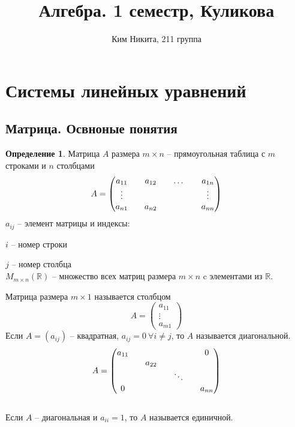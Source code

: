 \documentclass[a4paper, 12pt]{article}
\title{\textbf{Алгебра. 1 семестр, Куликова}}
\author{Ким Никита, 211 группа}
\theoremstyle{definition}
\newtheorem*{definition}{Определение}
\begin{document}
\fontsize{14pt}{20pt}\selectfont
    \maketitle
    \newpage
    \tableofcontents
    \fontsize{14pt}{20pt}\selectfont
    \newpage
    
    \section{Системы линейных уравнений}
    \subsection{Матрица. Освноные понятия}
    \begin{definition}
        Матрица $A$ размера $m\times n$ --   прямоугольная таблица с $m$ строками и $n$ столбцами 
        $$A = \begin{pmatrix}
            a_{11} && a_{12} && \dots && a_{1n}\\
            \vdots && \null && \null && \vdots\\
            a_{n1} && a_{n2} && \null && a_{nn}
        \end{pmatrix}$$
        $a_{ij}$ -- элемент матрицы и индексы:
        
        $i$ -- номер строки
        
        $j$ -- номер столбца\\
        $M_{m\times n}(\mathbb{R})$ -- множество всех матриц размера $m\times n$ c элементами из $\mathbb{R}$.
    \end{definition}
    Матрица размера $m\times 1$  называется столбцом $$A = \begin{pmatrix}
        a_{11}\\ \vdots\\ a_{m1}
    \end{pmatrix}$$
    Если $A = (a_{ij})$ -- квадратная, $a_{ij} = 0\ \forall i \neq j$, то $A$ называется диагональной.
    $$A = \begin{pmatrix}
        a_{11} && \null && \null && 0\\
        \null && a_{22} && \null && \null\\
        \null && \null && \ddots && \null\\
        0 && \null && \null && a_{nn}
    \end{pmatrix}$$   \\
    Если $A$ -- диагональная и $a_{ii} = 1$, то $A$ называется единичной.
\end{document}
